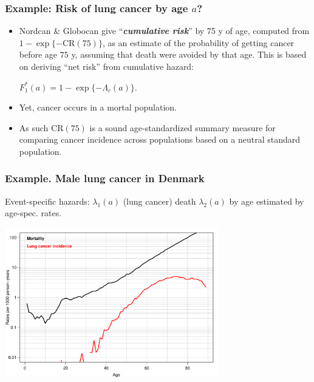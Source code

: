\documentclass[handout,12pt,dvipsnames,t]{beamer}
\begin{document}
\begin{frame}
   \frametitle{Example: Risk of lung cancer by age $a$?}

\begin{itemize}
 \item 
 Nordcan \& Globocan give 
``\textbf{\textit{cumulative risk}}'' by 75 y of age, computed from 
$1 - \exp\{-\text{CR}(75)\}$, as an estimate  of the probability of 
getting cancer before age $75$ y, 
assuming that death were avoided by that age. This is based on 
deriving ``net risk'' from cumulative hazard:
\begin{center} 
$ F_1^*(a) = 1 - \exp\{ - \Lambda_c(a) \}. $
\end{center}
\medskip
\item
Yet, cancer occurs in a mortal population.
\medskip
\item
As such CR$({75})$ is a sound age-standardized summary 
 measure for comparing cancer incidence across populations 
 based on a neutral standard population.
\end{itemize}

\end{frame}

\begin{frame}
\frametitle{Example. Male lung cancer in Denmark}

Event-specific hazards: $\lambda_1(a)$ (lung cancer) death $\lambda_2(a)$ by age estimated by age-spec. rates.

\includegraphics[height=6.5cm]{lung-ca-rates}
\end{frame}
\end{document}
